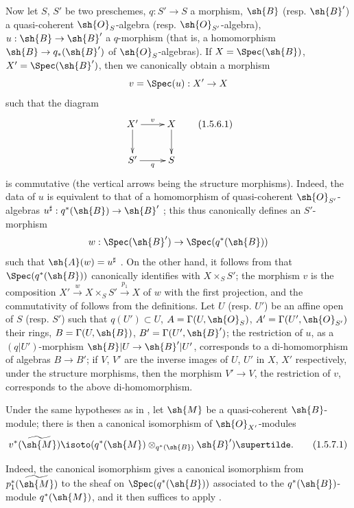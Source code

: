 \begin{env}[1.5.6]
\label{II.1.5.6}
Now let $S$, $S'$ be two preschemes, $q:S'\to S$ a morphism, $\sh{B}$ (resp. $\sh{B}'$) a quasi-coherent $\sh{O}_S$-algebra (resp. $\sh{O}_{S'}$-algebra), $u:\sh{B}\to\sh{B}'$ a $q$-morphism (that is, a homomorphism $\sh{B}\to q_*(\sh{B}')$ of $\sh{O}_S$-algebras).
If $X=\Spec(\sh{B})$, $X'=\Spec(\sh{B}')$, then we canonically obtain a morphism
\[
  v=\Spec(u):X'\to X
\]
such that the diagram
\[
\label{II.1.5.6.1}
  \xymatrix{
    X'\ar[r]^-{v}\ar[d] & X\ar[d]\\
    S'\ar[r]_-{q} & S
  }
  \tag{1.5.6.1}
\]
is commutative (the vertical arrows being the structure morphisms).
Indeed, the data of $u$ is equivalent to that of a homomorphism of quasi-coherent $\sh{O}_{S'}$-algebras $u^\sharp:q^*(\sh{B})\to\sh{B}'$ ; this thus canonically defines an $S'$-morphism
\[
  w:\Spec(\sh{B}')\to\Spec(q^*(\sh{B}))
\]
such that $\sh{A}(w)=u^\sharp$ .
On the other hand, it follows from  that $\Spec(q^*(\sh{B}))$ canonically identifies with $X\times_S S'$; the morphism $v$ is the composition $X'\xrightarrow{w}X\times_S S'\xrightarrow{p_1}X$ of $w$ with the first projection, and the commutativity of  follows from the definitions.
Let $U$ (resp. $U'$) be an affine open of $S$ (resp. $S'$) such that $q(U')\subset U$, $A=\Gamma(U,\sh{O}_S)$, $A'=\Gamma(U',\sh{O}_{S'})$ their rings, $B=\Gamma(U,\sh{B})$, $B'=\Gamma(U',\sh{B}')$; the restriction of $u$, as a $(q|U')$-morphism $\sh{B}|U\to\sh{B}'|U'$, corresponds to a di-homomorphism of algebras $B\to B'$; if $V$, $V'$ are the inverse images of $U$, $U'$ in $X$, $X'$ respectively, under the structure morphisms, then the morphism $V'\to V$, the restriction of $v$, corresponds  to the above di-homomorphism.
\end{env}

\begin{env}[1.5.7]
\label{II.1.5.7}
Under the same hypotheses as in , let $\sh{M}$ be a quasi-coherent $\sh{B}$-module; there is then a canonical isomorphism of $\sh{O}_{X'}$-modules
\[
\label{II.1.5.7.1}
  v^*(\widetilde{\sh{M}})\isoto(q^*(\sh{M})\otimes_{q^*(\sh{B})}\sh{B}')\supertilde.
  \tag{1.5.7.1}
\]

Indeed, the canonical isomorphism  gives a canonical isomorphism from $p_1^*(\widetilde{\sh{M}})$ to the sheaf on $\Spec(q^*(\sh{B}))$ associated to the $q^*(\sh{B})$-module $q^*(\sh{M})$, and it then suffices to apply .
\end{env}

